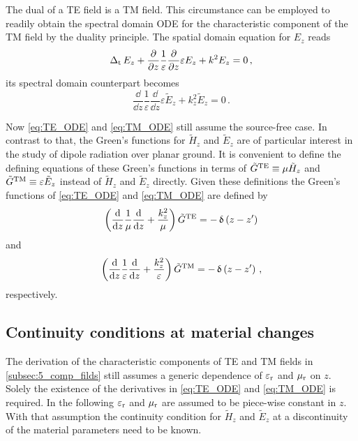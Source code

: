 The dual of a \ac{TE} field is a \ac{TM} field. This circumstance can be employed to readily obtain the spectral domain \ac{ODE} for the characteristic component of the \ac{TM} field by the duality principle. The spatial domain equation for $E_z$ reads
\begin{equation}\label{eq:E_z_pde}
	\operatorname{\operatorname{\Delta}_\mathrm{t}} E_z + \frac{\partial}{\partial z}\frac{1}{\varepsilon}\frac{\partial}{\partial z} \varepsilon E_z + k^2 E_z = 0 \,,
\end{equation}
its spectral domain counterpart becomes
\begin{equation}\label{eq:TM_ODE}
	\frac{\dd}{\dd z}\frac{1}{\varepsilon}\frac{\dd}{\dd z}\varepsilon \tilde{E}_z + k_z^2 \tilde{E}_z = 0 \,.
\end{equation}

Now \eqref{eq:TE_ODE} and \eqref{eq:TM_ODE} still assume the source-free case. In contrast to that, the Green's functions for $\tilde{H}_z$ and $\tilde{E}_z$ are of particular interest in the study of dipole radiation over planar ground. It is convenient to define the defining equations of these Green's functions in terms of $\tilde{G}^{\mathrm{TE}} \equiv \mu \tilde{H}_z$ and $\tilde{G}^{\mathrm{TM}} \equiv \varepsilon \tilde{E}_z$ instead of $\tilde{H}_z$ and $\tilde{E}_z$ directly. Given these definitions the Green's functions of \eqref{eq:TE_ODE} and \eqref{eq:TM_ODE} are defined by
\begin{equation}\label{eq:TE_ODE_GF}
	\left(\frac{\mathrm{d}}{\mathrm{d} z}\frac{1}{\mu}\frac{\mathrm{d}}{\mathrm{d} z} + \frac{k_z^2}{\mu}\right) \tilde{G}^{\mathrm{TE}} = -\operatorname{\updelta}\left(z-z^\prime\right)
\end{equation}
and
\begin{equation}\label{eq:TM_ODE_GF}
	\left(\frac{\mathrm{d}}{\mathrm{d} z}\frac{1}{\varepsilon}\frac{\mathrm{d}}{\mathrm{d} z} + \frac{k_z^2}{\varepsilon}\right) \tilde{G}^{\mathrm{TM}} = -\operatorname{\updelta}\left(z-z^\prime\right) \,,
\end{equation}
respectively.

\subsection{Continuity conditions at material changes}
\label{subsec:continuity_at_interfaces}

The derivation of the characteristic components of \ac{TE} and \ac{TM} fields in \cref{subsec:5_comp_filds} still assumes a generic dependence of $\varepsilon_{\mathrm{r}}$ and $\mu_{\mathrm{r}}$ on $z$. Solely the existence of the derivatives in \eqref{eq:TE_ODE} and \eqref{eq:TM_ODE} is required. In the following $\varepsilon_{\mathrm{r}}$ and $\mu_{\mathrm{r}}$ are assumed to be piece-wise constant in $z$. With that assumption the continuity condition for $\tilde{H}_z$ and $\tilde{E}_z$ at a discontinuity of the material parameters need to be known.

